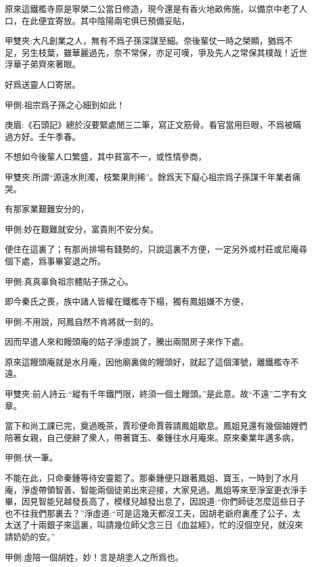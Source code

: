 \begin{parag}
    原來這鐵檻寺原是寧榮二公當日修造，現今還是有香火地畝佈施，以備京中老了人口，在此便宜寄放。其中陰陽兩宅俱已預備妥貼，\begin{note}甲雙夾:大凡創業之人，無有不爲子孫深謀至細。奈後輩仗一時之榮顯，猶爲不足，另生枝葉，雖華麗過先，奈不常保，亦足可嘆，爭及先人之常保其樸哉！近世浮華子弟齊來著眼。\end{note}好爲送靈人口寄居。\begin{note}甲側:祖宗爲子孫之心細到如此！\end{note}\begin{note}庚眉:《石頭記》總於沒要緊處閒三二筆，寫正文筋骨。看官當用巨眼，不爲被瞞過方好。壬午季春。\end{note}不想如今後輩人口繁盛，其中貧富不一，或性情參商，\begin{note}甲雙夾:所謂“源遠水則濁，枝繁果則稀”。餘爲天下癡心祖宗爲子孫謀千年業者痛哭。\end{note}有那家業艱難安分的，\begin{note}甲側:妙在艱難就安分，富貴則不安分矣。\end{note}便住在這裏了；有那尚排場有錢勢的，只說這裏不方便，一定另外或村莊或尼庵尋個下處，爲事畢宴退之所。\begin{note}甲側:真真辜負祖宗體貼子孫之心。\end{note}即今秦氏之喪，族中諸人皆權在鐵檻寺下榻，獨有鳳姐嫌不方便，\begin{note}甲側:不用說，阿鳳自然不肯將就一刻的。\end{note}因而早遣人來和饅頭庵的姑子淨虛說了，騰出兩間房子來作下處。
\end{parag}


\begin{parag}
    原來這饅頭庵就是水月庵，因他廟裏做的饅頭好，就起了這個渾號，離鐵檻寺不遠。\begin{note}甲雙夾:前人詩云:“縱有千年鐵門限，終須一個土饅頭。”是此意。故“不遠”二字有文章。\end{note}當下和尚工課已完，奠過晚茶，賈珍便命賈蓉請鳳姐歇息。鳳姐見還有幾個妯娌們陪著女親，自己便辭了衆人，帶著寶玉、秦鍾往水月庵來。原來秦業年邁多病，\begin{note}甲側:伏一筆。\end{note}不能在此，只命秦鍾等待安靈罷了。那秦鍾便只跟著鳳姐、寶玉，一時到了水月庵，淨虛帶領智善、智能兩個徒弟出來迎接，大家見過。鳳姐等來至淨室更衣淨手畢，因見智能兒越發長高了，模樣兒越發出息了，因說道:“你們師徒怎麼這些日子也不往我們那裏去？”淨虛道:“可是這幾天都沒工夫，因胡老爺府裏產了公子，太太送了十兩銀子來這裏，叫請幾位師父念三日《血盆經》，忙的沒個空兒，就沒來請奶奶的安。”\begin{note}甲側:虛陪一個胡姓，妙！言是胡塗人之所爲也。\end{note}
\end{parag}


